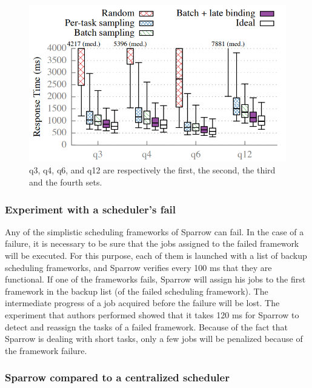 \documentclass[11pt]{article}
\begin{document}
            \begin{figure}
            		\includegraphics[scale=0.5]{fig4}
				\caption{q3, q4, q6, and q12 are respectively the first, the second, the third and the fourth sets.}            		
            		\label{fig4}
            \end{figure}
        
        
        \subsubsection*{Experiment with a scheduler's fail}
        
        	Any of the simplistic scheduling frameworks of Sparrow can fail. In the case of a failure, it is necessary to be sure that the jobs assigned to the failed framework will be executed. For this purpose, each of them is launched with a list of backup scheduling frameworks, and Sparrow verifies every 100 ms that they are functional. If one of the frameworks fails, Sparrow will assign his jobs to the first framework in the backup list (of the failed scheduling framework). The intermediate progress of a job acquired before the failure will be lost. The experiment that authors performed showed that it takes 120 ms for Sparrow to detect and reassign the tasks of a failed framework. Because of the fact that Sparrow is dealing with short tasks, only a few jobs will be penalized because of the framework failure.
        
        
        \subsubsection*{Sparrow compared to a centralized scheduler}
        
\end{document}
